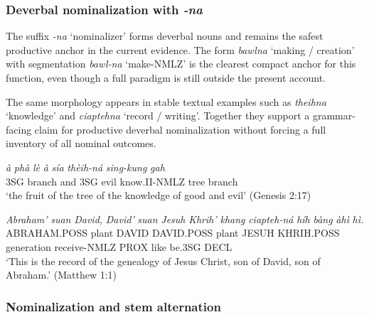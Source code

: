 \documentclass[
  11pt,
  a4paper,
]{article}
\newcommand{\tdim}[1]{\textit{#1}}
\newcommand{\tdimword}[1]{\textit{#1}}
\renewcommand{\textsc}[1]{{\footnotesize\MakeUppercase{#1}}}
\newcommand{\glossquote}[1]{`#1'}
\begin{document}
\subsubsection{\texorpdfstring{Deverbal nominalization with
\tdim{-na}}{Deverbal nominalization with }}\label{deverbal-nominalization-with}

The suffix \tdim{-na} \glossquote{nominalizer} forms deverbal nouns and
remains the safest productive anchor in the current evidence. The form
\tdim{bawlna} \glossquote{making / creation} with segmentation
\tdim{bawl-na} \glossquote{make-NMLZ} is the clearest compact anchor for
this function, even though a full paradigm is still outside the present
account.

The same morphology appears in stable textual examples such as
\tdim{theihna} \glossquote{knowledge} and \tdim{ciaptehna}
\glossquote{record / writing}. Together they support a grammar-facing
claim for productive deverbal nominalization without forcing a full
inventory of all nominal outcomes.

\begin{exe}
\ex \label{ex:nmlz-theihna-gen2}
\gll \tdimword{à} \tdimword{phà} \tdimword{lè} \tdimword{à} \tdimword{sía} \tdimword{thèih-ná} \tdimword{sing-kung} \tdimword{gah} \\
     \textsc{3sg} branch and \textsc{3sg} evil know.\textsc{ii}-\textsc{nmlz} tree branch \\
\glt \glossquote{the fruit of the tree of the knowledge of good and evil} (Genesis 2:17)
\end{exe}

\begin{exe}
\ex \label{ex:nmlz-ciaptehna-matt1}
\gll \tdimword{Abraham'} \tdimword{suan} \tdimword{David,} \tdimword{David'} \tdimword{suan} \tdimword{Jesuh} \tdimword{Khrih'} \tdimword{khang} \tdimword{ciapteh-ná} \tdimword{híh} \tdimword{bàng} \tdimword{àhì} \tdimword{hì.} \\
     \textsc{abraham}.\textsc{poss} plant \textsc{david} \textsc{david}.\textsc{poss} plant \textsc{jesuh} \textsc{khrih}.\textsc{poss} generation receive-\textsc{nmlz} \textsc{prox} like be.\textsc{3sg} \textsc{decl} \\
\glt \glossquote{This is the record of the genealogy of Jesus Christ, son of David, son of Abraham.} (Matthew 1:1)
\end{exe}

\subsubsection{Nominalization and stem
alternation}\label{nominalization-and-stem-alternation}
\end{document}
